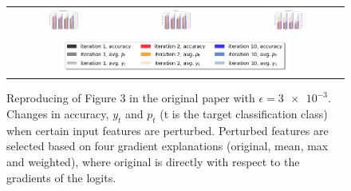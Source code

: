 \begin{figure}[t]
\begin{tabular}{c c c}
    \includegraphics[width = 0.3\textwidth]{figures/grad_sign_perturbation/mobilenetv3small_eps003.png} &
    \includegraphics[width = 0.3\textwidth]{figures/grad_sign_perturbation/mnasnet_eps003.png} &
    \includegraphics[width = 0.3\textwidth]{figures/grad_sign_perturbation/efficientnetB1_eps003.png} \\

\multicolumn{3}{c}{\includegraphics[width = 0.7\textwidth]{figures/grad_sign_perturbation/legend.png} }\\
\end{tabular}
\caption{Reproducing of Figure 3 in the original paper with $\epsilon=\num{3e-3}$. Changes in accuracy, $y_t$ and $p_t$ (t is the target classification class) when certain input features are perturbed. Perturbed features are selected based on four gradient explanations (original, mean, max and weighted), where original is directly with respect to the gradients of the logits.} \label{f:grad_sign_perturbation_eps_003}
\end{figure}